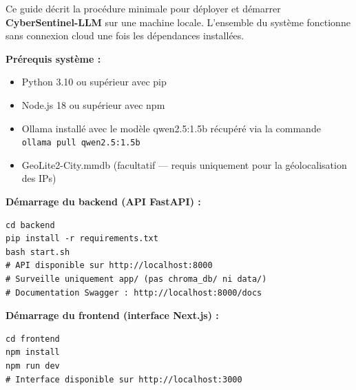 \documentclass[12pt,a4paper]{report}
\begin{document}
Ce guide décrit la procédure minimale pour déployer et démarrer
\textbf{CyberSentinel-LLM} sur une machine locale. L'ensemble du système
fonctionne sans connexion cloud une fois les dépendances installées.

\textbf{Prérequis système :}
\begin{itemize}
  \item[\ding{43}] Python 3.10 ou supérieur avec pip
  \item[\ding{43}] Node.js 18 ou supérieur avec npm
  \item[\ding{43}] Ollama installé avec le modèle qwen2.5:1.5b
  récupéré via la commande \texttt{ollama pull qwen2.5:1.5b}
  \item[\ding{43}] GeoLite2-City.mmdb (facultatif — requis uniquement
  pour la géolocalisation des IPs)
\end{itemize}

\textbf{Démarrage du backend (API FastAPI) :}
\begin{tcolorbox}[colback=lightblue, colframe=darkblue, arc=5pt]
\begin{small}
\begin{verbatim}
cd backend
pip install -r requirements.txt
bash start.sh
# API disponible sur http://localhost:8000
# Surveille uniquement app/ (pas chroma_db/ ni data/)
# Documentation Swagger : http://localhost:8000/docs
\end{verbatim}
\end{small}
\end{tcolorbox}

\textbf{Démarrage du frontend (interface Next.js) :}
\begin{tcolorbox}[colback=lightblue, colframe=darkblue, arc=5pt]
\begin{small}
\begin{verbatim}
cd frontend
npm install
npm run dev
# Interface disponible sur http://localhost:3000
\end{verbatim}
\end{small}
\end{tcolorbox}
\end{document}
